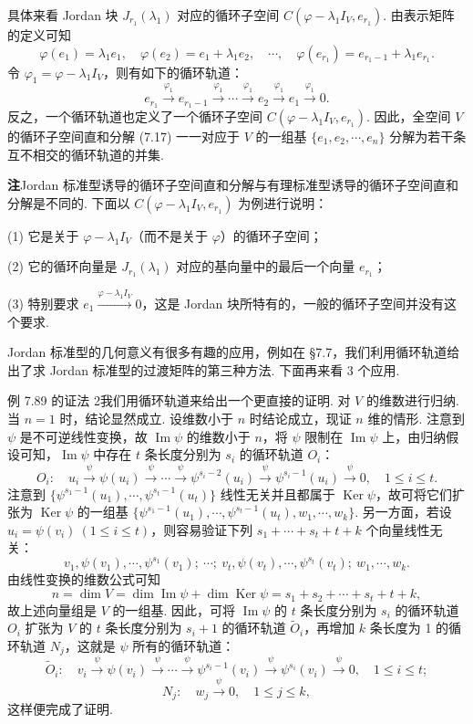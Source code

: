 \documentclass[UTF8,12pt,a4paper,fontset=fandol]{ctexart}
\begin{document}
具体来看 Jordan 块 $J_{r_1}(\lambda_1)$ 对应的循环子空间 $C(\varphi-\lambda_1I_V,e_{r_1})$. 由表示矩阵的定义可知
\[
\varphi(e_1)=\lambda_1e_1,\quad \varphi(e_2)=e_1+\lambda_1e_2,\quad \cdots,\quad \varphi(e_{r_1})=e_{r_1-1}+\lambda_1e_{r_1}.
\]
令 $\varphi_1=\varphi-\lambda_1I_V$，则有如下的循环轨道：
\[
e_{r_1}\xrightarrow{\varphi_1}e_{r_1-1}\xrightarrow{\varphi_1}\cdots\xrightarrow{\varphi_1}e_2\xrightarrow{\varphi_1}e_1\xrightarrow{\varphi_1}0.
\]
反之，一个循环轨道也定义了一个循环子空间 $C(\varphi-\lambda_1I_V,e_{r_1})$. 因此，全空间 $V$ 的循环子空间直和分解 (7.17) 一一对应于 $V$ 的一组基 $\{e_1,e_2,\cdots,e_n\}$ 分解为若干条互不相交的循环轨道的并集.

\noindent\textbf{注}\quad Jordan 标准型诱导的循环子空间直和分解与有理标准型诱导的循环子空间直和分解是不同的. 下面以 $C(\varphi-\lambda_1I_V,e_{r_1})$ 为例进行说明：

(1) 它是关于 $\varphi-\lambda_1I_V$（而不是关于 $\varphi$）的循环子空间；

(2) 它的循环向量是 $J_{r_1}(\lambda_1)$ 对应的基向量中的最后一个向量 $e_{r_1}$；

(3) 特别要求 $e_1\xrightarrow{\varphi-\lambda_1I_V}0$，这是 Jordan 块所特有的，一般的循环子空间并没有这个要求.

Jordan 标准型的几何意义有很多有趣的应用，例如在 §7.7，我们利用循环轨道给出了求 Jordan 标准型的过渡矩阵的第三种方法. 下面再来看 3 个应用.

例 7.89 的证法 2\quad 我们用循环轨道来给出一个更直接的证明. 对 $V$ 的维数进行归纳. 当 $n=1$ 时，结论显然成立. 设维数小于 $n$ 时结论成立，现证 $n$ 维的情形. 注意到 $\psi$ 是不可逆线性变换，故 $\operatorname{Im}\psi$ 的维数小于 $n$，将 $\psi$ 限制在 $\operatorname{Im}\psi$ 上，由归纳假设可知，$\operatorname{Im}\psi$ 中存在 $t$ 条长度分别为 $s_i$ 的循环轨道 $O_i$：
\[
O_i:\quad u_i\xrightarrow{\psi}\psi(u_i)\xrightarrow{\psi}\cdots\xrightarrow{\psi}\psi^{s_i-2}(u_i)\xrightarrow{\psi}\psi^{s_i-1}(u_i)\xrightarrow{\psi}0,\quad 1\le i\le t.
\]
注意到 $\{\psi^{s_1-1}(u_1),\cdots,\psi^{s_t-1}(u_t)\}$ 线性无关并且都属于 $\operatorname{Ker}\psi$，故可将它们扩张为 $\operatorname{Ker}\psi$ 的一组基 $\{\psi^{s_1-1}(u_1),\cdots,\psi^{s_t-1}(u_t),w_1,\cdots,w_k\}$. 另一方面，若设 $u_i=\psi(v_i)\ (1\le i\le t)$，则容易验证下列 $s_1+\cdots+s_t+t+k$ 个向量线性无关：
\[
v_1,\psi(v_1),\cdots,\psi^{s_1}(v_1);\ \cdots;\ v_t,\psi(v_t),\cdots,\psi^{s_t}(v_t);\ w_1,\cdots,w_k.
\]
由线性变换的维数公式可知
\[
n=\dim V=\dim\operatorname{Im}\psi+\dim\operatorname{Ker}\psi=s_1+s_2+\cdots+s_t+t+k,
\]
故上述向量组是 $V$ 的一组基. 因此，可将 $\operatorname{Im}\psi$ 的 $t$ 条长度分别为 $s_i$ 的循环轨道 $O_i$ 扩张为 $V$ 的 $t$ 条长度分别为 $s_i+1$ 的循环轨道 $\widetilde O_i$，再增加 $k$ 条长度为 1 的循环轨道 $N_j$，这就是 $\psi$ 所有的循环轨道：
\[
\widetilde O_i:\quad v_i\xrightarrow{\psi}\psi(v_i)\xrightarrow{\psi}\cdots\xrightarrow{\psi}\psi^{s_i-1}(v_i)\xrightarrow{\psi}\psi^{s_i}(v_i)\xrightarrow{\psi}0,\quad 1\le i\le t;
\]
\[
N_j:\quad w_j\xrightarrow{\psi}0,\quad 1\le j\le k,
\]
这样便完成了证明.
\end{document}
